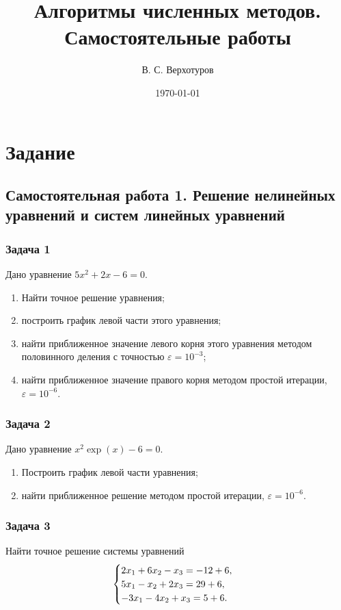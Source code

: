 \documentclass[10pt, a4paper, titlepage]{article}
\title{Алгоритмы численных методов. \\ Самостоятельные работы}
\author{В. С. Верхотуров}
\affil{БСБО-05-20}
\affil{РТУ МИРЭА}
\date\today
\begin{document}
\maketitle
\tableofcontents
\newpage

\section*{Задание}

\subsection*{Самостоятельная работа \textnumero{} 1. Решение нелинейных уравнений и систем линейных уравнений}

\subsubsection*{Задача 1}
Дано уравнение $5x^2+2x-6=0$.
\begin{enumerate}
    \item Найти точное решение уравнения;
    \item построить график левой части этого уравнения;
    \item найти приближенное значение левого корня этого уравнения методом половинного деления с точностью $\varepsilon=10^{-3}$;
    \item найти приближенное значение правого корня методом простой итерации, $\varepsilon=10^{-6}$.
\end{enumerate}

\subsubsection*{Задача 2}
Дано уравнение $x^2\exp(x)-6=0$.
\begin{enumerate}
    \item Построить график левой части уравнения;
    \item найти приближенное решение методом простой итерации, $\varepsilon=10^{-6}$.
\end{enumerate}

\subsubsection*{Задача 3}
Найти точное решение системы уравнений
\begin{equation*}
    \begin{cases}
        $$2x_1+6x_2-x_3 = -12+6$$, \\
        $$5x_1-x_2+2x_3 = 29+6$$, \\
        $$-3x_1-4x_2+x_3 = 5+6$$.
    \end{cases}
\end{equation*}
\end{document}
